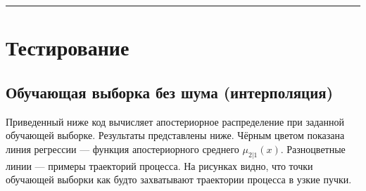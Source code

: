 \documentclass[11pt,a4paper]{article}
\begin{document}
    \begin{center}\rule{0.5\linewidth}{0.5pt}\end{center}

\newpage

    \hypertarget{ux442ux435ux441ux442ux438ux440ux43eux432ux430ux43dux438ux435}{%
\section{Тестирование}\label{ux442ux435ux441ux442ux438ux440ux43eux432ux430ux43dux438ux435}}

    \hypertarget{ux43eux431ux443ux447ux430ux44eux449ux430ux44f-ux432ux44bux431ux43eux440ux43aux430-ux431ux435ux437-ux448ux443ux43cux430-ux438ux43dux442ux435ux440ux43fux43eux43bux44fux446ux438ux44f}{%
\subsection{Обучающая выборка без шума
(интерполяция)}\label{ux43eux431ux443ux447ux430ux44eux449ux430ux44f-ux432ux44bux431ux43eux440ux43aux430-ux431ux435ux437-ux448ux443ux43cux430-ux438ux43dux442ux435ux440ux43fux43eux43bux44fux446ux438ux44f}}

Приведенный ниже код вычисляет апостериорное распределение при заданной
обучающей выборке. Результаты представлены ниже. Чёрным цветом показана
линия регрессии --- функция апостериорного среднего \(\mu_{2|1}(x)\).
Разноцветные линии --- примеры траекторий процесса. На рисунках видно,
что точки обучающей выборки как будто захватывают траектории процесса в
узкие пучки.
\end{document}
